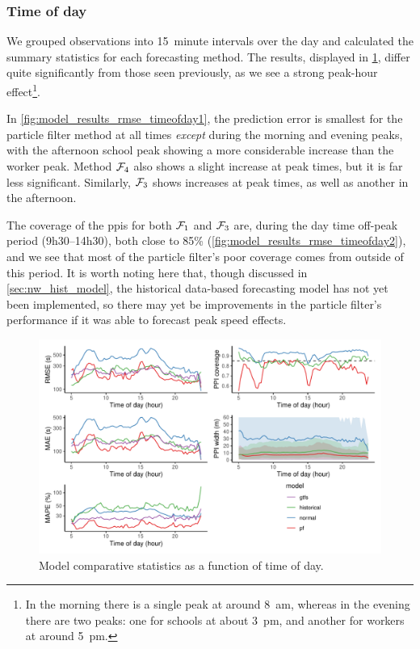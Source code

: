 \subsubsection{Time of day}

We grouped observations into 15~minute intervals over the day and calculated the summary statistics for each forecasting method. The results, displayed in \cref{fig:model_results_rmse_timeofday}, differ quite significantly from those seen previously, as we see a strong peak-hour effect\footnote{In the morning there is a single peak at around 8~am, whereas in the evening there are two peaks: one for schools at about 3~pm, and another for workers at around 5~pm.}.

In \cref{fig:model_results_rmse_timeofday1}, the prediction error is smallest for the particle filter method at all times \emph{except} during the morning and evening peaks, with the afternoon school peak showing a more considerable increase than the worker peak. Method $\mathcal{F}_4$ also shows a slight increase at peak times, but it is far less significant. Similarly, $\mathcal{F}_3$ shows increases at peak times, as well as another in the afternoon.


The coverage of the \glspl{ppi} for both $\mathcal{F}_1$ and $\mathcal{F}_3$ are, during the day time off-peak period (9h30--14h30), both close to 85\% (\cref{fig:model_results_rmse_timeofday2}), and we see that most of the particle filter's poor coverage comes from outside of this period. It is worth noting here that, though discussed in \cref{sec:nw_hist_model}, the historical data-based forecasting model has not yet been implemented, so there may yet be improvements in the particle filter's performance if it was able to forecast peak speed effects.





\begin{knitrout}\small
{}\color{fgcolor}\begin{figure}
\includegraphics[width=\textwidth]{figure/model_results_rmse_timeofday-1} \caption[Model comparative statistics as a function of time of day]{Model comparative statistics as a function of time of day.}\label{fig:model_results_rmse_timeofday}
\end{figure}


\end{knitrout}


